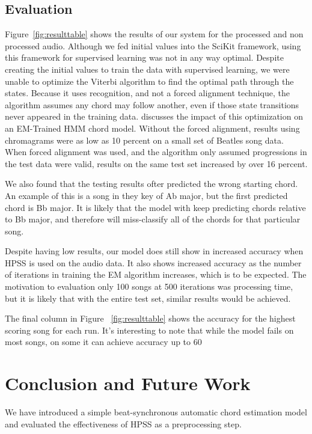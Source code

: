 \documentclass{article}
\begin{document}
\subsection{Evaluation}

Figure~\ref{fig:resulttable} shows the results of our system for the processed and
non processed audio. Although we fed initial values into the SciKit framework, using
this framework for supervised learning was not in any way optimal.  Despite creating the 
initial values to train the data with supervised learning, we were unable to optimize the 
Viterbi algorithm to find the optimal path through the states. Because it uses recognition, 
and not a forced alignment technique, the algorithm assumes any chord may follow another, 
even if those state transitions never appeared in the training data. \cite{Danellis:23} discusses 
the impact of this optimization on an EM-Trained HMM chord model. Without the
forced alignment, results using chromagrams were as low as 10 percent on a small set of 
Beatles song data. When forced alignment was used, and the algorithm only assumed 
progressions in the test data were valid, results on the same test set increased by over 16 percent. 

We also found that the testing results ofter predicted the wrong starting chord. An example of this is a
song in they key of Ab major, but the first predicted chord is Bb major. It is
likely that the model with keep predicting chords relative to Bb major, and
therefore will miss-classify all of the chords for that particular song.

Despite having low results, our model does still show in increased accuracy when HPSS is used on the
audio data. It also shows increased accuracy as the number of iterations in training the EM algorithm
increases, which is to be expected. The motivation to evaluation only 100 songs at 500 iterations was
processing time, but it is likely that with the entire test set, similar results would be achieved.

The final column in Figure ~\ref{fig:resulttable} shows the accuracy for the highest scoring song for
each run. It's interesting to note that while the model fails on most songs, on some it can achieve
accuracy up to 60%


\section{Conclusion and Future Work}

We have introduced a simple beat-synchronous automatic chord estimation model
and evaluated the effectiveness of HPSS as a preprocessing step.
\end{document}
